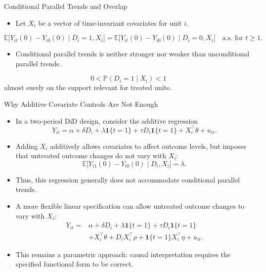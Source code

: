 \documentclass[11pt,aspectratio=169]{beamer}
\newcommand{\E}{\mathbb{E}}
\newcommand{\Prob}{\mathbb{P}}
\newcommand{\ind}{\mathbf{1}}
\begin{document}
\begin{frame}{Conditional Parallel Trends and Overlap}
\begin{itemize}
  \item Let $X_i$ be a vector of time-invariant covariates for unit $i$.
\end{itemize}
\begin{definitionbox}
\[\E\bigl[Y_{it}(0)-Y_{i0}(0)\mid D_i=1,X_i\bigr]=\E\bigl[Y_{it}(0)-Y_{i0}(0)\mid D_i=0,X_i\bigr]\quad\text{a.s. for } t\ge1.\]
\end{definitionbox}
\begin{itemize}
  \item Conditional parallel trends is neither stronger nor weaker than unconditional parallel trends.
\end{itemize}
\begin{definitionbox}[Overlap]
\[0<\Prob(D_i=1\mid X_i)<1\]
almost surely on the support relevant for treated units.
\end{definitionbox}
\end{frame}

\begin{frame}{Why Additive Covariate Controls Are Not Enough}
\small
\begin{itemize}
  \item In a two-period DiD design, consider the additive regression
  \[Y_{it}=\alpha+\delta D_i+\lambda\ind\{t=1\}+\tau D_i\ind\{t=1\}+X_i^\top\theta+u_{it}.\]
  \item Adding $X_i$ additively allows covariates to affect outcome levels, but imposes that untreated outcome changes do not vary with $X_i$:
  \[\E\bigl[Y_{i1}(0)-Y_{i0}(0)\mid D_i,X_i\bigr]=\lambda.\]
  \item Thus, this regression generally does not accommodate conditional parallel trends.
  \item A more flexible linear specification can allow untreated outcome changes to vary with $X_i$:
  \[
  \begin{aligned}
    Y_{it}={}&\alpha+\delta D_i+\lambda\ind\{t=1\}+\tau D_i\ind\{t=1\}\\
    &+X_i^\top\theta+D_iX_i^\top\rho+\ind\{t=1\}X_i^\top\eta+u_{it}.
  \end{aligned}
  \]
  \item This remains a parametric approach: causal interpretation requires the specified functional form to be correct.
\end{itemize}
\end{frame}
\end{document}
